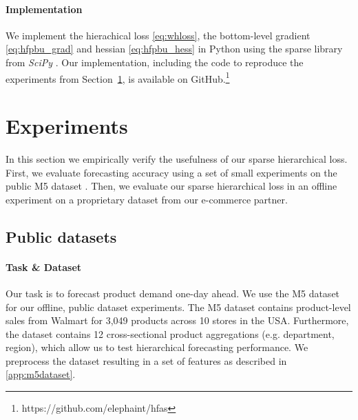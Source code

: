 \documentclass[preprint, 3p, times, twocolumn]{elsarticle}
\begin{document}
\paragraph{Implementation} We implement the hierachical loss \eqref{eq:whloss}, the bottom-level gradient \eqref{eq:hfpbu_grad} and hessian \eqref{eq:hfpbu_hess} in Python using the sparse library from \textit{SciPy} \cite{virtanen_scipy_2020}. Our implementation, including the code to reproduce the experiments from Section~\ref{sec:experiments}, is available on GitHub.\footnote{https://github.com/elephaint/hfas}

\section{Experiments}
  \label{sec:experiments}
  In this section we empirically verify the usefulness of our sparse hierarchical loss. First, we evaluate forecasting accuracy using a set of small experiments on the public M5 dataset \cite{makridakis_m5_2021}. Then, we evaluate our sparse hierarchical loss in an offline experiment on a proprietary dataset from our e-commerce partner.

  \subsection{Public datasets} \label{subsec:publicdatasets}
  \paragraph{Task \& Dataset} Our task is to forecast product demand one-day ahead. We use the M5 dataset \cite{makridakis_m5_2021} for our offline, public dataset experiments. The M5 dataset contains product-level sales from Walmart for 3,049 products across 10 stores in the USA. Furthermore, the dataset contains 12 cross-sectional product aggregations (e.g. department, region), which allow us to test hierarchical forecasting performance. We preprocess the dataset resulting in a set of features as described in \ref{app:m5dataset}.
  
\end{document}
